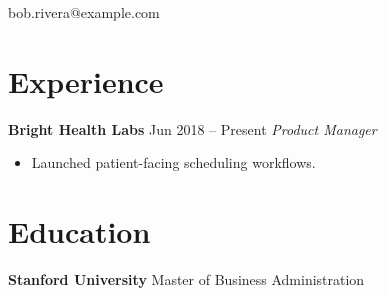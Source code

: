 \documentclass{article}
\begin{document}
\def\name{Bob Rivera}
bob.rivera@example.com

\section{Experience}
\textbf{Bright Health Labs} \hfill Jun 2018 -- Present
\textit{Product Manager}
\begin{itemize}
\item Launched patient-facing scheduling workflows.
\end{itemize}

\section{Education}
\textbf{Stanford University}
Master of Business Administration
\end{document}
